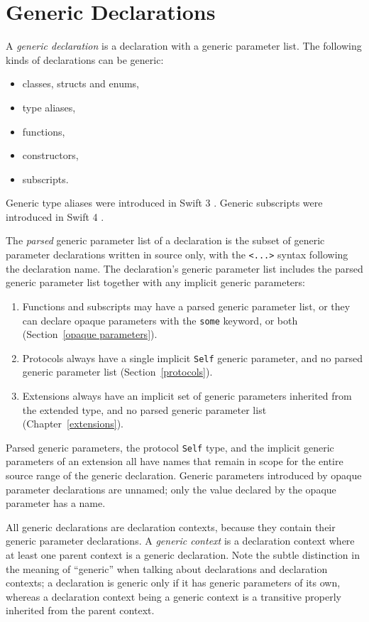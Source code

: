 \documentclass[a4paper,headsepline,bibliography=totoc,toc=flat,fleqn,twoside=semi]{scrbook}
\theoremstyle{definition}
\theoremstyle{definition}
\theoremstyle{definition}
\begin{document}
\chapter{Generic Declarations}\label{generic declarations}

A \emph{generic declaration} is a declaration with a generic parameter list. The following kinds of declarations can be generic:
\begin{itemize}
\item classes, structs and enums,
\item type aliases,
\item functions,
\item constructors,
\item subscripts.
\end{itemize}
Generic type aliases were introduced in Swift 3 \cite{se0048}. Generic subscripts were introduced in Swift 4 \cite{se0148}.

The \emph{parsed} generic parameter list of a declaration is the subset of generic parameter declarations written in source only, with the \texttt{<...>} syntax following the declaration name. The declaration's generic parameter list includes the parsed generic parameter list together with any implicit generic parameters:
\begin{enumerate}
\item Functions and subscripts may have a parsed generic parameter list, or they can declare opaque parameters with the \texttt{some} keyword, or both (Section~\ref{opaque parameters}).
\item Protocols always have a single implicit \texttt{Self} generic parameter, and no parsed generic parameter list (Section~\ref{protocols}).
\item Extensions always have an implicit set of generic parameters inherited from the extended type, and no parsed generic parameter list (Chapter~\ref{extensions}).
\end{enumerate}
Parsed generic parameters, the protocol \texttt{Self} type, and the implicit generic parameters of an extension all have names that remain in scope for the entire source range of the generic declaration. Generic parameters introduced by opaque parameter declarations are unnamed; only the value declared by the opaque parameter has a name.

All generic declarations are declaration contexts, because they contain their generic parameter declarations. A \emph{generic context} is a declaration context where at least one parent context is a generic declaration. Note the subtle distinction in the meaning of ``generic'' when talking about declarations and declaration contexts; a declaration is generic only if it has generic parameters of its own, whereas a declaration context being a generic context is a transitive properly inherited from the parent context.
\end{document}
